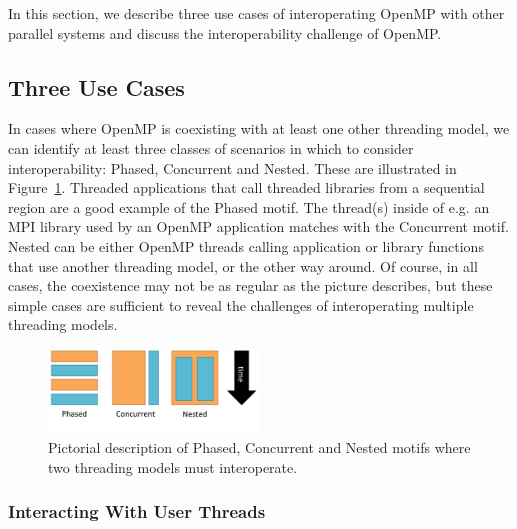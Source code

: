 In this section, we describe three use cases of interoperating OpenMP with other parallel systems
and discuss the interoperability challenge of OpenMP.
\subsection{Three Use Cases} %

In cases where OpenMP is coexisting with at least one other threading model,
we can identify at least three classes of scenarios in which to consider
interoperability: Phased, Concurrent and Nested.
These are illustrated in Figure~\ref{fig:interop-motif}.
Threaded applications that call threaded libraries from a sequential region
are a good example of the Phased motif.
The thread(s) inside of e.g. an MPI library used by an OpenMP application
matches with the Concurrent motif.
Nested can be either OpenMP threads calling application or library
functions that use another threading model, or the other way around.
Of course, in all cases, the coexistence may not be as regular as
the picture describes, but these simple cases are sufficient to reveal
the challenges of interoperating multiple threading models.
\begin{figure}[htb]
\centering
\includegraphics[width=0.5\textwidth]{images/interop-motifs}
\caption{Pictorial description of Phased, Concurrent and Nested
motifs where two threading models must interoperate.
\label{fig:interop-motif}
}
\end{figure}


\subsubsection{Interacting With User Threads}


